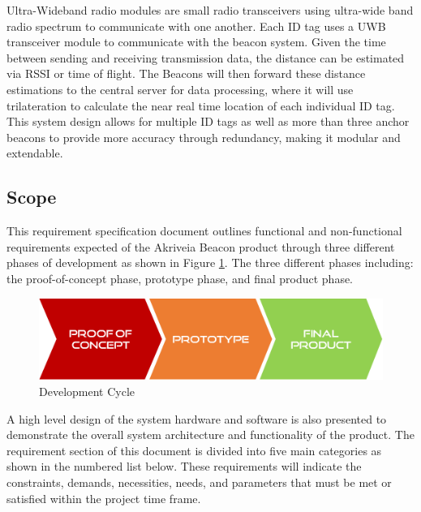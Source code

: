 \bigskip
Ultra-Wideband radio modules are small radio transceivers using ultra-wide band radio spectrum to communicate with one another. Each ID tag uses a UWB transceiver module to communicate with the beacon system. Given the time between sending and receiving transmission data, the distance can be estimated via \Gls{RSSI} or time of flight. The Beacons will then forward these distance estimations to the central server for data processing, where it will use trilateration to calculate the near real time location of each individual ID tag. This system design allows for multiple ID tags as well as more than three anchor beacons to provide more accuracy through redundancy, making it modular and extendable.

\break

\subsection{Scope}
This requirement specification document outlines functional and non-functional requirements expected of the Akriveia Beacon product through three different phases of development as shown in Figure \ref{dev}. The three different phases including: the proof-of-concept phase, prototype phase, and final product phase.
\medskip

\begin{figure}[H]
\centering
    \includegraphics[scale=0.4]{./images/dev-path.png}
    \caption{Development Cycle}
    \label{dev}
\end{figure}

A high level design of the system hardware and software is also presented to demonstrate the overall system architecture and functionality of the product. The requirement section of this document is divided into five main categories as shown in the numbered list below. These requirements will indicate the constraints, demands, necessities, needs, and parameters that must be met or satisfied within the project time frame.

